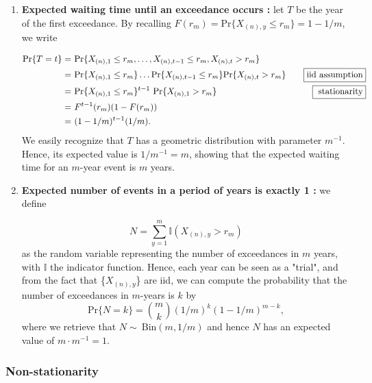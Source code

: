 \begin{enumerate}
	\item \textbf{Expected waiting time until an exceedance occurs :} let $T$ be the year of the first exceedance. By recalling $F(r_m) = \text{Pr} \big\{X_{(n),y}\leq r_m\big\}=1-1/m$, we write
	
	\begin{equation*}
	\begin{aligned}
	\text{Pr}\{T=t\}=\  & \text{Pr}\{X_{(n),1}\leq r_m,\dots,X_{(n),t-1}\leq r_m,X_{(n),t}>r_m\} \\
	=\ & \text{Pr}\{X_{(n),1}\leq r_m\}\dots\text{Pr}\{X_{(n),t-1}\leq r_m\}\text{Pr}\{X_{(n),t}>r_m\}&  \quad  \boxed{\textnormal{iid assumption}}\\
	= \ & \text{Pr}\{X_{(n),1}\leq r_m\}^{t-1}\ \text{Pr}\{X_{(n),1}>r_m\} &  \quad \boxed{\text{ stationarity}}\\
	=\ & F^{t-1}(r_m)(1-F(r_m))\\
	=\ & (1-1/m)^{t-1}(1/m).
	\end{aligned}
	\end{equation*}
	We easily recognize that $T$ has a geometric distribution with parameter $m^{-1}$. Hence, its expected value is $1/m^{-1}=m$, showing that the expected waiting time for an $m$-year event is $m$ years.
	
	\item \textbf{Expected number of events in a period of  years is exactly 1 :} we define  
	
	\begin{equation*}N=\sum_{y=1}^m \mathbb{I}(X_{(n),y}>r_m)
	\end{equation*}
	as the random variable representing the number of exceedances in $m$ years, with $\mathbb{I}$ the indicator function. Hence, each year can be seen as a "trial", and from the fact that \big\{$X_{(n),y}$\big\} are iid, we can compute the probability that the number of exceedances in $m$-years is $k$ by
	\begin{equation*}
	\text{Pr}\{N=k\}=\binom{m}{k}(1/m)^k(1-1/m)^{m-k},
	\end{equation*}
	where we retrieve that $N\sim \ \text{Bin}(m,1/m)$ and hence $N$ has an expected value of $m\cdot m^{-1}=1$.
	
\end{enumerate}


\subsubsection*{Non-stationarity}

